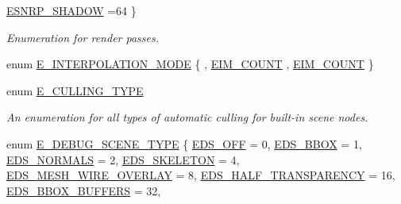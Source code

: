 \begin{DoxyCompactItemize}
\hyperlink{namespaceirr_1_1scene_a7862269bd1abc123929d4dbb8200d67fa215c035bf40a0785c29fe77754af923e}{E\+S\+N\+R\+P\+\_\+\+S\+H\+A\+D\+OW} =64
 \}\begin{DoxyCompactList}\small\item\em Enumeration for render passes. \end{DoxyCompactList}
\item 
enum \hyperlink{namespaceirr_1_1scene_a26f30865cf5527e7255a8495e280314c}{E\+\_\+\+I\+N\+T\+E\+R\+P\+O\+L\+A\+T\+I\+O\+N\+\_\+\+M\+O\+DE} \{ , \hyperlink{namespaceirr_1_1scene_a26f30865cf5527e7255a8495e280314ca92bbd54f1846a9f9575e5d67371ee824}{E\+I\+M\+\_\+\+C\+O\+U\+NT}
, \hyperlink{namespaceirr_1_1scene_a26f30865cf5527e7255a8495e280314ca92bbd54f1846a9f9575e5d67371ee824}{E\+I\+M\+\_\+\+C\+O\+U\+NT}
 \}
\item 
\mbox{\label{namespaceirr_1_1scene_acabb2772476aa3706e65a7dc77fd9cce}} 
enum \hyperlink{namespaceirr_1_1scene_acabb2772476aa3706e65a7dc77fd9cce}{E\+\_\+\+C\+U\+L\+L\+I\+N\+G\+\_\+\+T\+Y\+PE} \begin{DoxyCompactList}\small\item\em An enumeration for all types of automatic culling for built-\/in scene nodes. \end{DoxyCompactList}
\item 
enum \hyperlink{namespaceirr_1_1scene_a52b664c4c988113735042b168fc32dbe}{E\+\_\+\+D\+E\+B\+U\+G\+\_\+\+S\+C\+E\+N\+E\+\_\+\+T\+Y\+PE} \{ \newline
\hyperlink{namespaceirr_1_1scene_a52b664c4c988113735042b168fc32dbeaf355ec89e97a2df70c65c224a6c564e7}{E\+D\+S\+\_\+\+O\+FF} = 0, 
\hyperlink{namespaceirr_1_1scene_a52b664c4c988113735042b168fc32dbea1baade14ae50b9b2fb94b0df1178f418}{E\+D\+S\+\_\+\+B\+B\+OX} = 1, 
\hyperlink{namespaceirr_1_1scene_a52b664c4c988113735042b168fc32dbea862af264cdc5a7d496d744de37eacbb5}{E\+D\+S\+\_\+\+N\+O\+R\+M\+A\+LS} = 2, 
\hyperlink{namespaceirr_1_1scene_a52b664c4c988113735042b168fc32dbea183a7756266ff645145b72af76e2fdb5}{E\+D\+S\+\_\+\+S\+K\+E\+L\+E\+T\+ON} = 4, 
\newline
\hyperlink{namespaceirr_1_1scene_a52b664c4c988113735042b168fc32dbeac695322b1f8de8eb291d95ad4b9fd4c6}{E\+D\+S\+\_\+\+M\+E\+S\+H\+\_\+\+W\+I\+R\+E\+\_\+\+O\+V\+E\+R\+L\+AY} = 8, 
\hyperlink{namespaceirr_1_1scene_a52b664c4c988113735042b168fc32dbea951223a62c5390ee5cfa03763849f17a}{E\+D\+S\+\_\+\+H\+A\+L\+F\+\_\+\+T\+R\+A\+N\+S\+P\+A\+R\+E\+N\+CY} = 16, 
\hyperlink{namespaceirr_1_1scene_a52b664c4c988113735042b168fc32dbeaba4c3a14d1e69643339a0833638a473a}{E\+D\+S\+\_\+\+B\+B\+O\+X\+\_\+\+B\+U\+F\+F\+E\+RS} = 32, 

\end{DoxyCompactItemize}
